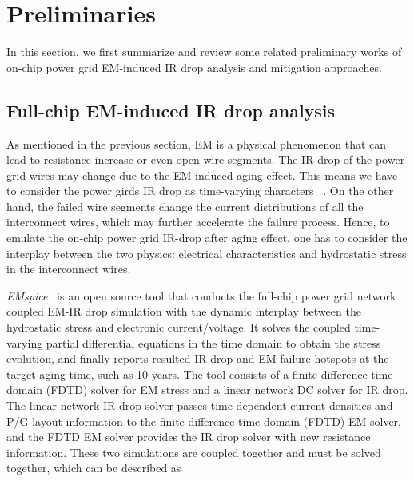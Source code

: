 \section{Preliminaries}
\label{sec:related}

In this section, we first summarize and review some related preliminary works of on-chip power grid EM-induced IR drop analysis and mitigation approaches.

\subsection{Full-chip EM-induced IR drop analysis}
\label{subsec:emspice}
As mentioned in the previous section, EM is a physical phenomenon that can lead to resistance increase or even open-wire segments.  The IR drop of the power grid wires may change due to the EM-induced aging effect. This means we have to consider the power girds IR drop as time-varying characters ~\cite{SunYu:TDMR'20, Huang:TCAD'15, Chatterjee:2018TCAD,SukharevNajm:2018TDMR}. 
On the other hand, the failed wire segments change the current distributions of all the interconnect wires, which may further accelerate the failure process. Hence, to emulate the on-chip power grid IR-drop after aging effect, one has to consider the interplay between the two physics: electrical characteristics and hydrostatic stress in the interconnect wires.

{\it EMspice}~\cite{SunYu:TDMR'20,EMspiceSourceCode} is an open source tool that conducts the full-chip power grid network coupled EM-IR drop simulation with the dynamic interplay between the hydrostatic stress and electronic current/voltage. It solves the coupled time-varying partial differential equations in the time domain to obtain the stress evolution, and finally reports resulted IR drop and EM failure hotspots at the target aging time, such as 10 years.  The tool consists of a finite difference time domain (FDTD) solver for EM stress and a linear network DC solver for IR drop. The linear network IR drop solver passes time-dependent current densities and P/G layout information to the finite difference time domain (FDTD) EM solver, and the FDTD EM solver provides the IR drop solver with new resistance information. These two simulations are coupled together and must be solved together, which can be described as


